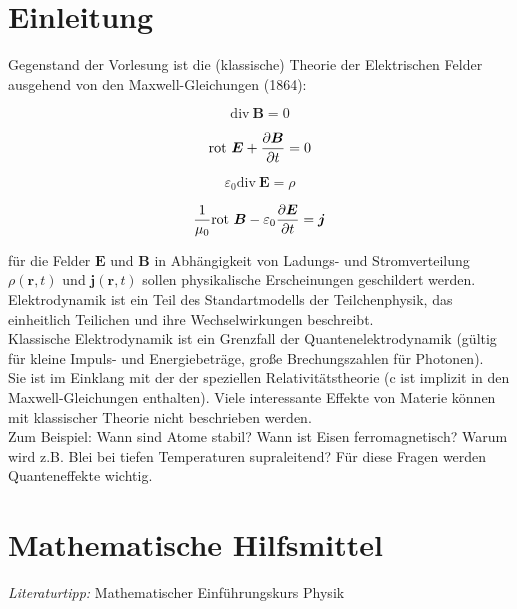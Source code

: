 \chapter*{Einleitung}
Gegenstand der Vorlesung ist die (klassische) Theorie der Elektrischen Felder ausgehend von den Maxwell-Gleichungen (1864):

\begin{equation*}
\text{div} \ \bm{B}=0
\end{equation*}

\begin{equation*}
\text{rot} \ \bm{E}+\pdiff{\bm{B}}{t}=0
\end{equation*}

\begin{equation*}
\varepsilon_0\text{div} \ \bm{E}=\rho
\end{equation*}

\begin{equation*}
\frac{1}{\mu_0}\text{rot} \ \bm{B}-\varepsilon_0\pdiff{\bm{E}}{t}=\bm{j}
\end{equation*}

für die Felder $\bm{E}$ und $\bm{B}$ in Abhängigkeit von Ladungs- und Stromverteilung $\rho(\bm{r},t)$ und $\bm{j}(\bm{r},t)$  sollen physikalische Erscheinungen geschildert werden.\\
Elektrodynamik ist ein Teil des Standartmodells der Teilchenphysik, das einheitlich Teilichen und ihre Wechselwirkungen beschreibt.\\
Klassische Elektrodynamik ist ein Grenzfall der Quantenelektrodynamik (gültig für kleine Impuls- und Energiebeträge, große Brechungszahlen für Photonen).\\
Sie ist im Einklang mit der der speziellen Relativitätstheorie (c ist implizit in den Maxwell-Gleichungen enthalten). Viele interessante Effekte von Materie können mit klassischer Theorie nicht beschrieben werden.\\
Zum Beispiel: Wann sind Atome stabil? Wann ist Eisen ferromagnetisch? Warum wird z.B. Blei bei tiefen Temperaturen supraleitend? Für diese Fragen werden Quanteneffekte wichtig.
\chapter{Mathematische Hilfsmittel}
\emph{Literaturtipp:} Mathematischer Einführungskurs Physik\\
\linebreak
